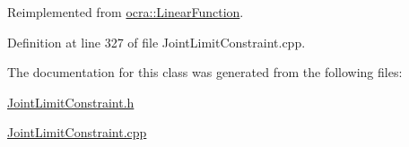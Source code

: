 Reimplemented from \hyperlink{classocra_1_1LinearFunction_a546454cd8d0909f99433ffc0e700c9e3}{ocra\+::\+Linear\+Function}.



Definition at line 327 of file Joint\+Limit\+Constraint.\+cpp.



The documentation for this class was generated from the following files\+:\begin{DoxyCompactItemize}
\item 
\hyperlink{JointLimitConstraint_8h}{Joint\+Limit\+Constraint.\+h}\item 
\hyperlink{JointLimitConstraint_8cpp}{Joint\+Limit\+Constraint.\+cpp}\end{DoxyCompactItemize}
